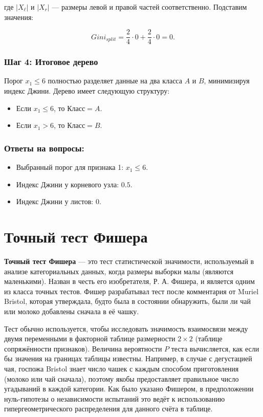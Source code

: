 \begin{solution}
    где $|X_\ell|$ и $|X_r|$ — размеры левой и правой частей соответственно. Подставим значения:
    
    \[
        Gini_{split} = \frac{2}{4} \cdot 0 + \frac{2}{4} \cdot 0 = 0.
    \]
    
    \subsubsection*{Шаг 4: Итоговое дерево}
    
    Порог $x_1 \leq 6$ полностью разделяет данные на два класса $A$ и $B$, минимизируя индекс Джини. Дерево имеет следующую структуру:
    
    \begin{itemize}
        \item Если $x_1 \leq 6$, то $Класс = A$.
        \item Если $x_1 > 6$, то $Класс = B$.
    \end{itemize}
    
    \subsubsection*{Ответы на вопросы:}
    
    \begin{itemize}
        \item Выбранный порог для признака 1: $x_1 \leq 6$.
        \item Индекс Джини у корневого узла: $0.5$.
        \item Индекс Джини у листов: $0$.
    \end{itemize}
\end{solution}

\section*{Точный тест Фишера}

\textbf{Точный тест Фишера} — это тест статистической значимости, используемый в анализе категориальных данных, когда размеры выборки малы (являются маленькими). Назван в честь его изобретателя, Р. А. Фишера, и является одним из класса точных тестов. Фишер разрабатывал тест после комментария от Muriel Bristol, которая утверждала, будто была в состоянии обнаружить, были ли чай или молоко добавлены сначала в её чашку.

Тест обычно используется, чтобы исследовать значимость взаимосвязи между двумя переменными в факторной таблице размерности $2 \times 2$ (таблице сопряжённости признаков). Величина вероятности $P$ теста вычисляется, как если бы значения на границах таблицы известны. Например, в случае с дегустацией чая, госпожа Bristol знает число чашек с каждым способом приготовления (молоко или чай сначала), поэтому якобы предоставляет правильное число угадываний в каждой категории. Как было указано Фишером, в предположении нуль-гипотезы о независимости испытаний это ведёт к использованию гипергеометрического распределения для данного счёта в таблице.

